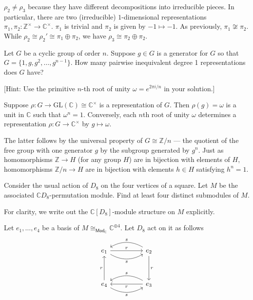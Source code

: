 \documentclass[12pt]{article}
\begin{document}
$\rho_{2} \neq \rho_{3}$ because they have different decompositions into irreducible pieces. In particular, there are two (irreducible) $1$-dimensional representations $\pi_{1}, \pi_{2} : \mathbb{Z}^{\times} \to \mathbb{C}^{\times}$. $\pi_{1}$ is trivial and $\pi_{2}$ is given by $-1 \mapsto -1$. As previously, $\pi_{1} \not \cong \pi_{2}$. While $\rho_{2} \cong \rho_{2}' \cong \pi_{1} \oplus \pi_{2}$, we have $\rho_{3} \cong \pi_{2} \oplus \pi_{2}$.

\newpage

\begin{tcolorbox}[title=Exercise 2]
Let $G$ be a cyclic group of order $n$. Suppose $g \in G$ is a generator for $G$ so that $G = \{ 1, g, g^2, \dots, g^{n-1} \}$. How many pairwise inequivalent degree 1 representations does $G$ have? 

\bigskip

[Hint:  Use the primitive $n$-th root of unity $\omega = e^{2 \pi i / n}$ in your solution.] 
\end{tcolorbox}

\bigskip

Suppose $\rho : G \to \mathrm{GL}(\mathbb{C}) \cong \mathbb{C}^{\times}$ is a representation of $G$. Then $\rho(g) = \omega$ is a unit in $\mathbb{C}$ such that $\omega^{n} = 1$. Conversely, each $n$th root of unity $\omega$ determines a representation $\rho : G \to \mathbb{C}^{\times}$ by $g \mapsto \omega$.

The latter follows by the universal property of $G \cong \mathbb{Z} / n$ --- the quotient of the free group with one generator $g$ by the subgroup generated by $g^{n}$. Just as homomorphisms $\mathbb{Z} \to H$ (for any group $H$) are in bijection with elements of $H$, homomorphisms $\mathbb{Z} / n \to H$ are in bijection with elements $h \in H$ satisfying $h^{n} = 1$.

\newpage

\begin{tcolorbox}[title=Exercise 3]
Consider the usual action of $D_8$ on the four vertices of a square. Let $M$ be the associated $\mathbb{C}D_8$-permutation module. Find at least four distinct submodules of $M$. 
\end{tcolorbox}

\bigskip

For clarity, we write out the $\mathbb{C}[D_{8}]$-module structure on $M$ explicitly.

Let $e_{1}, \dots, e_{4}$ be a basis of $M \cong_{\mathsf{Mod}_{\mathbb{C}}} \mathbb{C}^{\oplus 4}$. Let $D_{8}$ act on it as follows
 \[
	\begin{tikzcd}
		e_{1} \ar[rr, "r"] \ar[rr, "s"', bend right] && e_{2} \ar[dd, "r"] \ar[ll, "s"', bend right] \\ \\
		e_{4} \ar[uu, "r"] \ar[rr, "s"', bend right] && e_{3} \ar[ll, "r"] \ar[ll, "s"', bend right]
	\end{tikzcd}
\]
\end{document}
